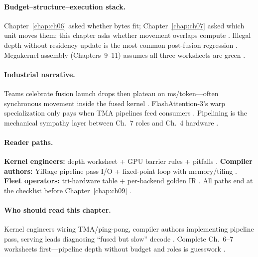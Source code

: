 \paragraph{Budget--structure--execution stack.}
Chapter~\ref{chap:ch06} asked whether bytes fit; Chapter~\ref{chap:ch07} asked which unit moves them; this chapter asks whether movement overlaps compute \citep{yirage2026,shah2024flashattention3,dao2022flashattention}.
Illegal depth without residency update is the most common post-fusion regression \citep{memoryfloor2026,wu2024mirage,chen2020compilerbasedhardw}.
Megakernel assembly (Chapters~9--11) assumes all three worksheets are green \citep{mpk2025,semianalysis2024tma}.

\paragraph{Industrial narrative.}
Teams celebrate fusion launch drops then plateau on ms/token---often synchronous movement inside the fused kernel \citep{taxbreak2026,patel2025llminference,memoryfloor2026}.
FlashAttention-3's warp specialization only pays when TMA pipelines feed consumers \citep{shah2024flashattention3,semianalysis2024tma}.
Pipelining is the mechanical sympathy layer between Ch.~7 roles and Ch.~4 hardware \citep{nvidia2022hopper,yirage2026}.

\paragraph{Reader paths.}
\textbf{Kernel engineers:} depth worksheet + GPU barrier rules + pitfalls \citep{shah2024flashattention3,taxbreak2026}.
\textbf{Compiler authors:} YiRage pipeline pass I/O + fixed-point loop with memory/tiling \citep{yirage2026,wu2024mirage,mpk2025}.
\textbf{Fleet operators:} tri-hardware table + per-backend golden IR \citep{amd2024xdna,patel2025llminference,chen2020compilerbasedhardw}.
All paths end at the checklist before Chapter~\ref{chap:ch09} \citep{semianalysis2024tma,dao2022flashattention}.

\paragraph{Who should read this chapter.}
Kernel engineers wiring TMA/ping-pong, compiler authors implementing pipeline pass, serving leads diagnosing ``fused but slow'' decode \citep{shah2024flashattention3,yirage2026,patel2025llminference}.
Complete Ch.~6--7 worksheets first---pipeline depth without budget and roles is guesswork \citep{memoryfloor2026,dao2022flashattention,taxbreak2026}.

